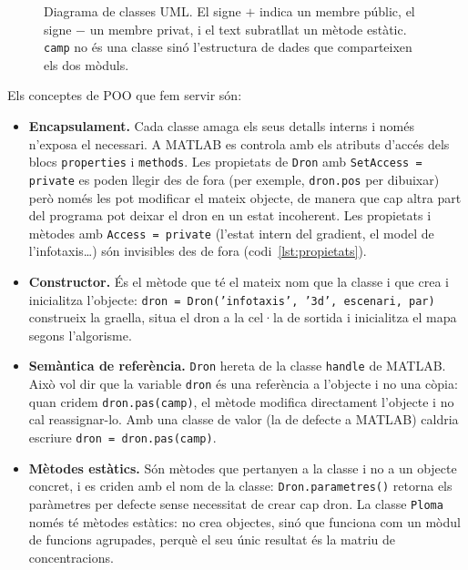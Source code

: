 \documentclass[11pt,a4paper]{article}
\begin{document}
\begin{figure}[htbp]
\caption{Diagrama de classes UML. El signe $+$ indica un membre públic, el signe $-$ un membre privat, i el text subratllat un mètode estàtic. \texttt{camp} no és una classe sinó l'estructura de dades que comparteixen els dos mòduls.}
\label{fig:uml}
\end{figure}

Els conceptes de POO que fem servir són:
\begin{itemize}
\item \textbf{Encapsulament.} Cada classe amaga els seus detalls interns i només n'exposa el necessari. A MATLAB es controla amb els atributs d'accés dels blocs \texttt{properties} i \texttt{methods}. Les propietats de \texttt{Dron} amb \texttt{SetAccess = private} es poden llegir des de fora (per exemple, \texttt{dron.pos} per dibuixar) però només les pot modificar el mateix objecte, de manera que cap altra part del programa pot deixar el dron en un estat incoherent. Les propietats i mètodes amb \texttt{Access = private} (l'estat intern del gradient, el model de l'infotaxis\ldots) són invisibles des de fora (codi~\ref{lst:propietats}).
\item \textbf{Constructor.} És el mètode que té el mateix nom que la classe i que crea i inicialitza l'objecte: \texttt{dron = Dron('infotaxis', '3d', escenari, par)} construeix la graella, situa el dron a la cel·la de sortida i inicialitza el mapa segons l'algorisme.
\item \textbf{Semàntica de referència.} \texttt{Dron} hereta de la classe \texttt{handle} de MATLAB. Això vol dir que la variable \texttt{dron} és una referència a l'objecte i no una còpia: quan cridem \texttt{dron.pas(camp)}, el mètode modifica directament l'objecte i no cal reassignar-lo. Amb una classe de valor (la de defecte a MATLAB) caldria escriure \texttt{dron = dron.pas(camp)}.
\item \textbf{Mètodes estàtics.} Són mètodes que pertanyen a la classe i no a un objecte concret, i es criden amb el nom de la classe: \texttt{Dron.parametres()} retorna els paràmetres per defecte sense necessitat de crear cap dron. La classe \texttt{Ploma} només té mètodes estàtics: no crea objectes, sinó que funciona com un mòdul de funcions agrupades, perquè el seu únic resultat és la matriu de concentracions.
\end{itemize}
\end{document}
